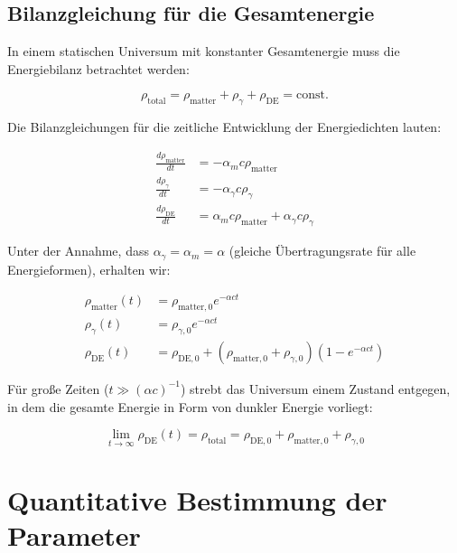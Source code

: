 \documentclass[a4paper,12pt]{article}
\theoremstyle{definition}
\theoremstyle{remark}
\begin{document}
	\subsection{Bilanzgleichung für die Gesamtenergie}
	
	In einem statischen Universum mit konstanter Gesamtenergie muss die Energiebilanz betrachtet werden:
	
	\begin{equation}
		\rho_{\text{total}} = \rho_{\text{matter}} + \rho_{\gamma} + \rho_{\text{DE}} = \text{const.}
	\end{equation}
	
	Die Bilanzgleichungen für die zeitliche Entwicklung der Energiedichten lauten:
	
	\begin{align}
		\frac{d\rho_{\text{matter}}}{dt} &= -\alpha_{m} c \rho_{\text{matter}} \\
		\frac{d\rho_{\gamma}}{dt} &= -\alpha_{\gamma} c \rho_{\gamma} \\
		\frac{d\rho_{\text{DE}}}{dt} &= \alpha_{m} c \rho_{\text{matter}} + \alpha_{\gamma} c \rho_{\gamma}
	\end{align}
	
	Unter der Annahme, dass $\alpha_{\gamma} = \alpha_{m} = \alpha$ (gleiche Übertragungsrate für alle Energieformen), erhalten wir:
	
	\begin{align}
		\rho_{\text{matter}}(t) &= \rho_{\text{matter},0} e^{-\alpha c t} \\
		\rho_{\gamma}(t) &= \rho_{\gamma,0} e^{-\alpha c t} \\
		\rho_{\text{DE}}(t) &= \rho_{\text{DE},0} + (\rho_{\text{matter},0} + \rho_{\gamma,0})(1 - e^{-\alpha c t})
	\end{align}
	
	Für große Zeiten ($t \gg (\alpha c)^{-1}$) strebt das Universum einem Zustand entgegen, in dem die gesamte Energie in Form von dunkler Energie vorliegt:
	
	\begin{equation}
		\lim_{t \rightarrow \infty} \rho_{\text{DE}}(t) = \rho_{\text{total}} = \rho_{\text{DE},0} + \rho_{\text{matter},0} + \rho_{\gamma,0}
	\end{equation}
	
	\section{Quantitative Bestimmung der Parameter}
	
\end{document}
